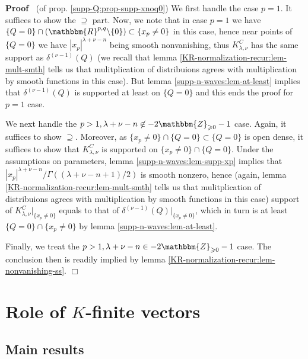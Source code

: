 \documentclass{article}
\newcommand{\nin}{\not\in}
\newenvironment{proof}{\noindent\textbf{Proof\ }}{\hspace*{\fill}$\Box$\medskip}
\numberwithin{definition}{section}
\numberwithin{lemma}{section}
\numberwithin{proposition}{section}
{\theorembodyfont{\rmfamily}\newtheorem{remark}{Remark}
\numberwithin{remark}{section}
}
\begin{document}
\begin{proof}
  (of prop. \ref{supp-Q:prop-supp-xnoq0}) We first handle the case $p = 1$. It
  suffices to show the $\supseteq$ part. Now, we note that in case $p = 1$ we
  have $\{ Q = 0 \} \cap ( \mathbbm{R}^{p, q} \backslash \{ 0 \}) \subset \{
  x_p \neq 0 \}$ in this case, hence near points of $\{ Q = 0 \}$ we have $|
  x_p |^{\lambda + \nu - n}$ being smooth nonvanishing, thus $K_{\lambda,
  \nu}^C$ has the same support as $\delta^{( \nu - 1)} ( Q)$ (we recall that
  lemma \ref{KR-normalization-recur:lem-mult-smth} tells us that
  mulitplication of distribuions agrees with multiplication by smooth
  functions in this case). But lemma \ref{supp-n-waves:lem-at-least} implies
  that $\delta^{( \nu - 1)} ( Q)$ is supported at least on $\{ Q = 0 \}$ and
  this ends the proof for $p = 1$ case.
  
  We next handle the $p > 1, \lambda + \nu - n \nin - 2\mathbbm{Z}_{\geqslant
  0} - 1$ case. Again, it suffices to show $\supseteq$. Moreover, as $\{ x_p
  \neq 0 \} \cap \{ Q = 0 \} \subset \{ Q = 0 \}$ is open dense, it suffices
  to show that $K_{\lambda, \nu}^C$ is supported on $\{ x_p \neq 0 \} \cap \{
  Q = 0 \}$. Under the assumptions on parameters, lemma
  \ref{supp-n-waves:lem-supp-xp} implies that $| x_p |^{\lambda + \nu - n} /
  \Gamma ( ( \lambda + \nu - n + 1) / 2)$ is smooth nonzero, hence (again,
  lemma \ref{KR-normalization-recur:lem-mult-smth} tells us that
  mulitplication of distribuions agrees with multiplication by smooth
  functions in this case) support of $K_{\lambda, \nu}^C |_{\{ x_p \neq 0 \}}$
  equals to that of $\delta^{( \nu - 1)} ( Q) |_{\{ x_p \neq 0 \}}$, which in
  turn is at least $\{ Q = 0 \} \cap \{ x_p \neq 0 \}$ by lemma
  \ref{supp-n-waves:lem-at-least}.
  
  Finally, we treat the $p > 1, \lambda + \nu - n \in -
  2\mathbbm{Z}_{\geqslant 0} - 1$ case. The conclusion then is readily implied
  by lemma \ref{KR-normalization-recur:lem-nonvanishing-ss}.
\end{proof}

\section{Role of $K$-finite vectors}\label{sec:k-finite}

\subsection{Main results}
\end{document}

